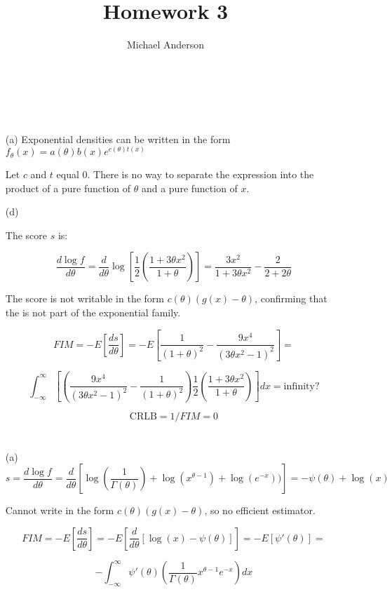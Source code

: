 \documentclass{article}
\author{Michael Anderson}
\title{Homework 3}
\begin{document}
\setlength{\parskip}{1em}
\maketitle
{}
\\
\flushleft
\newpage
\thispagestyle{empty}
\mbox{}
\pagebreak

\section{}
\begin{enumerate}
\item[(a)]
Exponential densities can be written in the form
$f_{\theta}(x) = a(\theta)b(x)e^{c(\theta)t(x)}$

Let $c$ and $t$ equal 0. There is no way to separate the expression into the
product of a pure function of $\theta$ and a pure function of $x$.

\item[(d)]

The score $s$ is:

\[
\frac{d \log f}{d\theta} = 
\frac{d}{d\theta} \log \left[ \frac{1}{2} \left( \frac{1+3\theta x^2}{1+\theta}
\right) \right] =
\frac{3x^2}{1+3\theta x^2} - \frac{2}{2+2\theta}
\]

The score is not writable in the form $c(\theta)(g(x) - \theta)$, confirming
that the is not part of the exponential family.

\[
FIM = -E\left[ \frac{ds}{d\theta}\right] =
-E \left[\frac{1}{(1+\theta)^2} - \frac{9x^4}{(3\theta x^2 - 1)^2}\right] =
\]

\[ 
\int_{-\infty}^{\infty} \left[ \left( \frac{9x^4}{(3\theta x^2 - 1)^2} - 
\frac{1}{(1+\theta)^2} \right) \frac{1}{2} \left( \frac{1+3\theta x^2}{1+\theta}
\right) \right] dx = \text{infinity?}
\]

\[
\text{CRLB} = 1/FIM = 0
\]

\end{enumerate}

\section{}
\begin{enumerate}
\item[(a)]
\[
s = \frac{d \log f}{d\theta} = \frac{d}{d\theta} \left[ \log \left(\frac{1}
{\Gamma(\theta)} \right) + \log(x^{\theta-1}) + \log(e^{-x})) \right] = 
-\psi(\theta) + \log(x)
\]

Cannot write in the form $c(\theta)(g(x)-\theta)$, so no efficient estimator.

\[
FIM = -E \left[ \frac{ds}{d\theta} \right] =
-E \left[ \frac{d}{d\theta} [\log(x) - \psi(\theta)] \right] =
-E [\psi '(\theta)] =
\]

\[
- \int_{-\infty}^{\infty} \psi'(\theta) \left( \frac{1}{\Gamma(\theta)}
x^{\theta-1} e^{-x} \right) dx
\]

\section{}


\end{enumerate}
\end{document}
